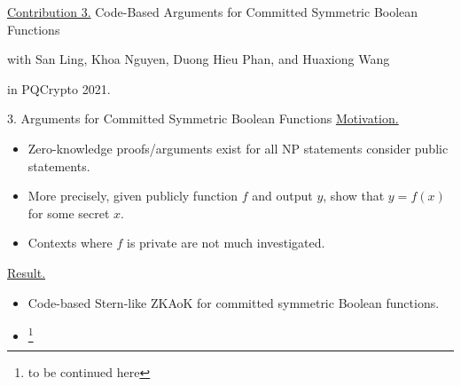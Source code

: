 \begin{frame}
	\underline{Contribution 3.} Code-Based Arguments for Committed Symmetric Boolean Functions
	
	{\small with San Ling, Khoa Nguyen, Duong Hieu Phan, and Huaxiong Wang}
	
	in PQCrypto 2021.
\end{frame}

\begin{frame}{3. Arguments for Committed Symmetric Boolean Functions}
	\underline{Motivation.} 
	\begin{itemize}
		\item Zero-knowledge proofs/arguments exist for all NP statements consider public statements.
		\item More precisely, given publicly function $f$ and output $y$, show that $y = f(x)$ for some secret $x$.
		\item Contexts where $f$ is private are not much investigated.
	\end{itemize}
	\underline{Result.}
	\begin{itemize}
		\item Code-based Stern-like ZKAoK for committed symmetric Boolean functions.
		\item \footnote{to be continued here}
	\end{itemize}
\end{frame}